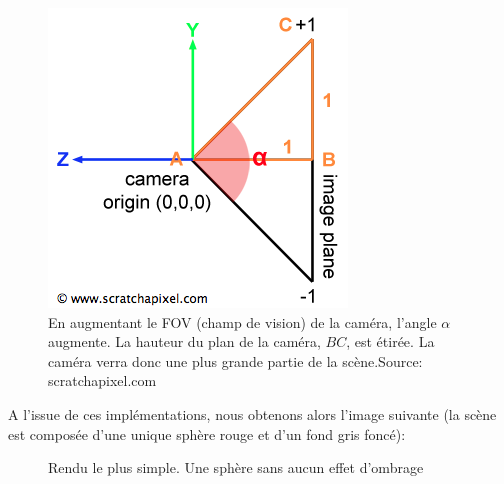 \documentclass[11pt]{article}
\begin{document}
\begin{figure}[h!]
	\includegraphics{img/rt/final/fovCamera.png}

	\label{fovCam}
	\caption{En augmentant le FOV (champ de vision) de la caméra, l'angle $\alpha$ augmente. La hauteur du plan de la caméra, $BC$, est étirée. La caméra verra donc une plus grande partie de la scène.\break Source: scratchapixel.com}
\end{figure}
\FloatBarrier

A l'issue de ces implémentations, nous obtenons alors l'image suivante (la scène est composée d'une unique sphère rouge et d'un fond gris foncé):

\begin{figure}[h!]

	\label{basicRender}
	\caption{Rendu le plus simple. Une sphère sans aucun effet d'ombrage}
\end{figure}
\FloatBarrier
\end{document}
